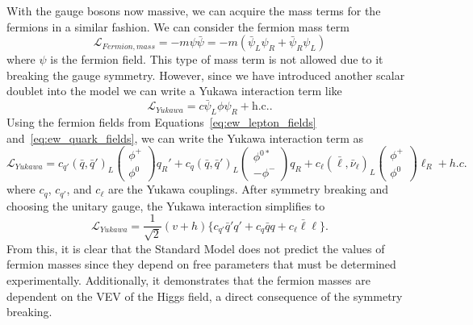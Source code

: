With the gauge bosons now massive, we can acquire the mass terms for the fermions in a similar fashion. We can consider the fermion mass term
\begin{equation}
  \mathcal{L}_{Fermion,mass} = -m\psi\bar{\psi} = -m(\bar{\psi}_{L}\psi_{R} + \bar{\psi}_{R}\psi_{L})
\end{equation}
where $\psi$ is the fermion field. This type of mass term is not allowed due to it breaking the gauge symmetry. However, since we have introduced another scalar doublet into the model we can write a Yukawa interaction term like
\begin{equation}
  \mathcal{L}_{Yukawa} = c\bar{\psi}_{L}\phi\psi_{R} + \mathrm{h.c.}.
  \label{eq:higgs_yukawa}
\end{equation}
Using the fermion fields from Equations~\ref{eq:ew_lepton_fields} and~\ref{eq:ew_quark_fields}, we can write the Yukawa interaction term as 
\begin{equation}
  \mathcal{L}_{Yukawa} = c_{q'} {(\bar{q}, \bar{q}')}_{L}\begin{pmatrix}
    \phi^{+} \\
    \phi^{0}
  \end{pmatrix}
  q_{R}' + c_{q}{(\bar{q}, \bar{q}')}_{L}\begin{pmatrix}
    \phi^{0*} \\
    -\phi^{-}
  \end{pmatrix}
  q_{R} + c_{\ell}{(\bar{\ell}, \bar{\nu}_{\ell})_{L}}\begin{pmatrix}
    \phi^{+} \\
    \phi^{0}
  \end{pmatrix}
  \ell_{R} + h.c.
\end{equation}
where $c_{q}$, $c_{q'}$, and $c_{\ell}$ are the Yukawa couplings. After symmetry breaking and choosing the unitary gauge, the Yukawa interaction simplifies to
\begin{equation}
  \mathcal{L}_{Yukawa} = \frac{1}{\sqrt{2}}(v+h)\{c_{q'}\bar{q}'q' + c_{q}\bar{q}q + c_{\ell}\bar{\ell}\ell\}.
\end{equation}
From this, it is clear that the Standard Model does not predict the values of fermion masses since they depend on free parameters that must be determined experimentally. Additionally, it demonstrates that the fermion masses are dependent on the VEV of the Higgs field, a direct consequence of the symmetry breaking. 

